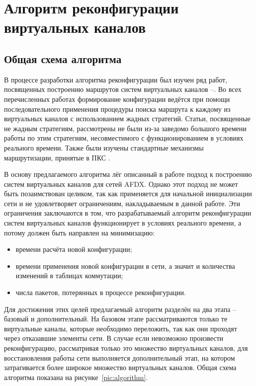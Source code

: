 \documentclass[12pt, a4paper]{article}
\begin{document}
\section{Алгоритм реконфигурации виртуальных каналов} \label{sec:alg}
\subsection{Общая схема алгоритма}

В процессе разработки алгоритма реконфигурации был изучен ряд работ, посвященных построению маршрутов систем виртуальных каналов \cite{alg1}--\cite{vdovinalg}. Во всех перечисленных работах формирование конфигурации ведётся при помощи последовательного применения процедуры поиска маршрута к каждому из виртуальных каналов с использованием жадных стратегий. Статьи, посвященные не жадным стратегиям, рассмотрены не были из-за заведомо большого времени работы по этим стратегиям, несовместимого с функционированием в условиях реального времени. Также были изучены стандартные механизмы маршрутизации, принятые в ПКС \cite{algsdn}.

В основу предлагаемого алгоритма лёг описанный в работе \cite{vdovinalg} подход к построению систем виртуальных каналов для сетей AFDX. Однако этот подход не может быть позаимствован целиком, так как применяется для начальной инициализации сети и не удовлетворяет ограничениям, накладываемым в данной работе. Эти ограничения заключаются в том, что разрабатываемый алгоритм реконфигурации систем виртуальных каналов функционирует в условиях реального времени, а потому должен быть направлен на минимизацию:
\begin{itemize}
	\item времени расчёта новой конфигурации;
	\item времени применения новой конфигурации в сети, а значит и количества изменений в таблицах коммутации;
	\item числа пакетов, потерянных в процессе реконфигурации.
\end{itemize} 

Для достижения этих целей предлагаемый алгоритм разделён на два этапа -- базовый и дополнительный. На базовом этапе рассматриваются только те виртуальные каналы, которые необходимо переложить, так как они проходят через отказавшие элементы сети. В случае если невозможно произвести реконфигурацию, рассматривая только это множество виртуальных каналов, для восстановления работы сети выполняется дополнительный этап, на котором затрагивается более широкое множество виртуальных каналов. Общая схема алгоритма показана на рисунке~\ref{pic:algorithm}.
\end{document}
